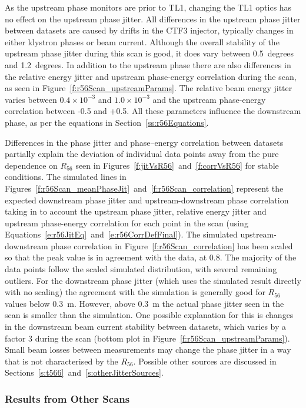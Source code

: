 As the upstream phase monitors are prior to TL1, changing the TL1 optics has no effect on the upstream phase jitter. All differences in the upstream phase jitter between datasets are caused by drifts in the CTF3 injector, typically changes in either klystron phases or beam current. Although the overall stability of the upstream phase jitter during this scan is good, it does vary between 0.5~degrees and 1.2~degrees. In addition to the upstream phase there are also differences in the relative energy jitter and upstream phase-energy correlation during the scan, as seen in Figure~\ref{f:r56Scan_upstreamParams}. The relative beam energy jitter varies between \(0.4\times10^{-3}\) and \(1.0\times10^{-3}\) and the upstream phase-energy correlation between -0.5 and +0.5. All these parameters influence the downstream phase, as per the equations in Section~\ref{ss:r56Equations}.

Differences in the phase jitter and phase--energy correlation between datasets partially explain the deviation of individual data points away from the pure dependence on \(R_{56}\) seen in Figures~\ref{f:jitVsR56}~and~\ref{f:corrVsR56} for stable conditions. The simulated lines in Figures~\ref{f:r56Scan_meanPhaseJit}~and~\ref{f:r56Scan_correlation} represent the expected downstream phase jitter and upstream-downstream phase correlation taking in to account the upstream phase jitter, relative energy jitter and upstream phase-energy correlation for each point in the scan (using Equations~\ref{e:r56JitEq}~and~\ref{e:r56CorrDefFinal}). The simulated upstream-downstream phase correlation in Figure~\ref{f:r56Scan_correlation} has been scaled so that the peak value is in agreement with the data, at 0.8. The majority of the data points follow the scaled simulated distribution, with several remaining outliers. For the downstream phase jitter (which uses the simulated result directly with no scaling) the agreement with the simulation is generally good for \(R_{56}\) values below 0.3~m. However, above 0.3~m the actual phase jitter seen in the scan is smaller than the simulation. One possible explanation for this is changes in the downstream beam current stability between datasets, which varies by a factor 3 during the scan (bottom plot in Figure~\ref{f:r56Scan_upstreamParams}). Small beam losses between measurements may change the phase jitter in a way that is not characterised by the \(R_{56}\). Possible other sources are discussed in Sections~\ref{s:t566}~and~\ref{s:otherJitterSources}.


\subsubsection{Results from Other Scans}

